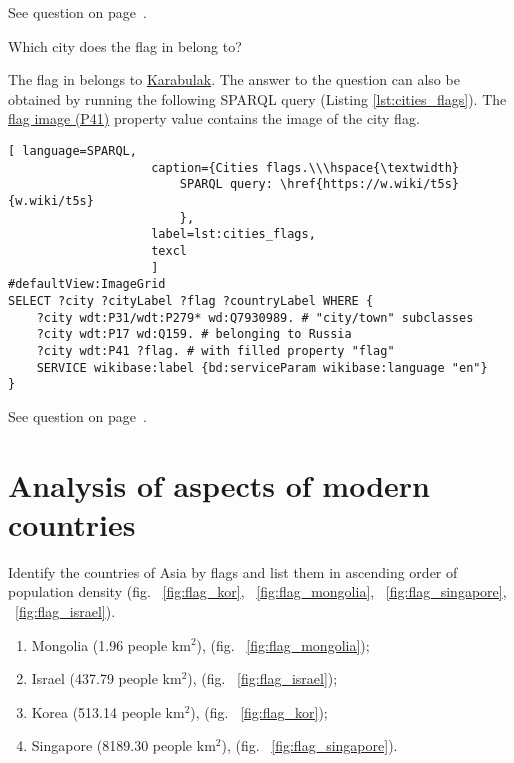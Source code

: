 See question on page~\pageref{question:cities_over_400_age}.

\begin{exercise}%
    \label{answer:cities_flags}
Which city does the flag in  belong to?
\end{exercise}

The flag in  belongs to \href{https://w.wiki/qqN}{Karabulak}. The answer to the question can also be obtained by running the following SPARQL query (Listing \ref{lst:cities_flags}). The \href{https://www.wikidata.org/wiki/Property:P41}{flag image (P41)} property value contains the image of the city flag.

\begin{lstlisting}[ language=SPARQL, 
                    caption={Cities flags.\\\hspace{\textwidth}
                        SPARQL query: \href{https://w.wiki/t5s}{w.wiki/t5s}
                        },
                    label=lst:cities_flags,
                    texcl 
                    ]
#defaultView:ImageGrid
SELECT ?city ?cityLabel ?flag ?countryLabel WHERE {
	?city wdt:P31/wdt:P279* wd:Q7930989. # "city/town" subclasses
	?city wdt:P17 wd:Q159. # belonging to Russia
	?city wdt:P41 ?flag. # with filled property "flag"
	SERVICE wikibase:label {bd:serviceParam wikibase:language "en"}
}
\end{lstlisting}%

See question on page~\pageref{question:cities_flags}.

\section{Analysis of aspects of modern countries}
\begin{exercise}
\label{answer:population_density}
Identify the countries of Asia by flags and list them in ascending order of population density (fig. ~\ref{fig:flag_kor}, ~\ref{fig:flag_mongolia}, ~\ref{fig:flag_singapore}, ~\ref{fig:flag_israel}).
\end{exercise}

\begin{enumerate}
\item Mongolia (\num{1.96} people km\begin{math}^2\end{math}), (fig. ~\ref{fig:flag_mongolia});
\item Israel (\num{437.79} people km\begin{math}^2\end{math}), (fig. ~\ref{fig:flag_israel});
\item Korea (\num{513.14} people km\begin{math}^2\end{math}), (fig. ~\ref{fig:flag_kor});
\item Singapore (\num{8189.30} people km\begin{math}^2\end{math}), (fig. ~\ref{fig:flag_singapore}).
\end{enumerate}


